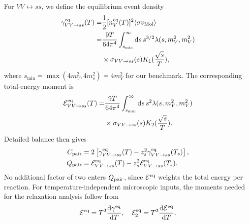 \documentclass[prd,showpacs,preprintnumbers,amsmath,amssymb,twocolumn,
superscriptaddress,notitlepage]{revtex4-2}
\begin{document}
For $VV\leftrightarrow ss$, we define the equilibrium event
density~\cite{Cirelli:2024ssz}
\begin{align}
\gamma_{VV\to ss}^{\rm eq}(T)
=&\frac12[n_V^{\rm eq}(T)]^2
\langle\sigma v_{\rm Mol}\rangle
\nonumber\\
=&\frac{9T}{64\pi^4}
\int_{s_{\min}}^\infty {\rm d}s\,
s^{3/2}\lambda(s,m_V^2,m_V^2)\nonumber\\
& \times\sigma_{VV\to ss}(s)K_1(\frac{\sqrt{s}}{T}),
\end{align}
where $s_{\min}=\max(4m_V^2,4m_s^2)=4m_V^2$ for our benchmark. 
The corresponding total-energy moment is
\cite{Fernandez:2021iti}
\begin{align*}
\mathcal E_{VV\to ss}^{\rm eq}(T)
=&\frac{9T}{64\pi^4}
\int_{s_{\min}}^\infty {\rm d}s\,
s^2\lambda(s,m_V^2,m_V^2)\\
& \times\sigma_{VV\to ss}(s)K_2(\frac{\sqrt{s}}{T}).
\end{align*}
Detailed balance then gives
\begin{align}
C_{\rm pair}
&=2\left[\gamma_{VV\to ss}^{\rm eq}(T)
-z_s^2\gamma_{VV\to ss}^{\rm eq}(T_s)\right],
\\
Q_{\rm pair}
&=\mathcal E_{VV\to ss}^{\rm eq}(T)
-z_s^2\mathcal E_{VV\to ss}^{\rm eq}(T_s).
\end{align}
No additional factor of two enters $Q_{\rm pair}$, since
$\mathcal E^{\rm eq}$ weights the total energy per reaction.
For temperature-independent microscopic inputs, the moments
needed for the relaxation analysis follow from
\[
\mathcal E^{\rm eq}
=T^2\frac{{\rm d}\gamma^{\rm eq}}{{\rm d}T},
\quad
\mathcal E_2^{\rm eq}
=T^2\frac{{\rm d}\mathcal E^{\rm eq}}{{\rm d}T}.
\]
\end{document}
